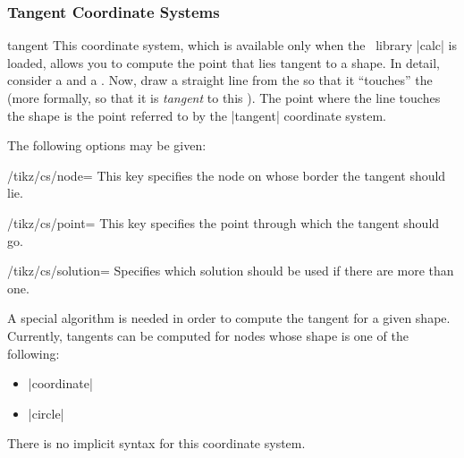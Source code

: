 \subsubsection{Tangent Coordinate Systems}

\begin{coordinatesystem}{tangent}
    This coordinate system, which is available only when the \tikzname\ library
    |calc| is loaded, allows you to compute the point that lies tangent to a
    shape. In detail, consider a  and a . Now, draw a
    straight line from the  so that it ``touches'' the 
    (more formally, so that it is \emph{tangent} to this ). The
    point where the line touches the shape is the point referred to by the
    |tangent| coordinate system.

    The following options may be given:
    \begin{key}{/tikz/cs/node=}
        This key specifies the node on whose border the tangent should lie.
    \end{key}
    \begin{key}{/tikz/cs/point=}
        This key specifies the point through which the tangent should go.
    \end{key}
    \begin{key}{/tikz/cs/solution=}
        Specifies which solution should be used if there are more than one.
    \end{key}

    A special algorithm is needed in order to compute the tangent for a given
    shape. Currently, tangents can be computed for nodes whose shape is one of
    the following:
    \begin{itemize}
        \item |coordinate|
        \item |circle|
    \end{itemize}
\begin{codeexample}[]
\end{codeexample}

    There is no implicit syntax for this coordinate system.
\end{coordinatesystem}


